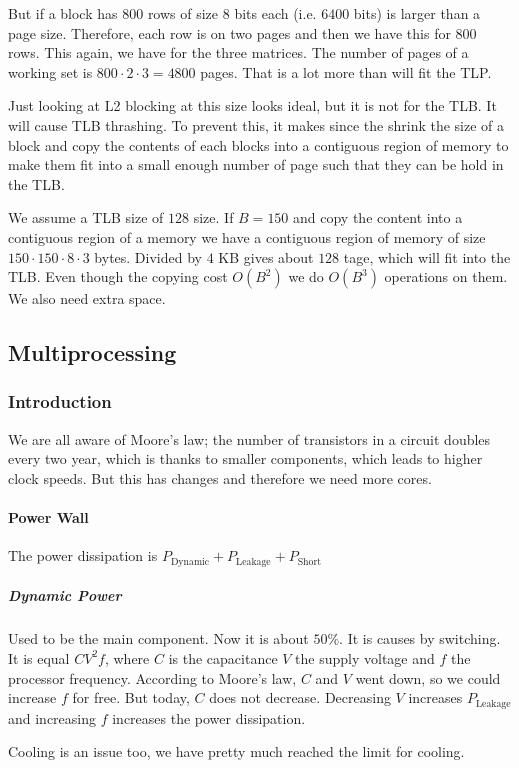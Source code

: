 But if a block has $800$ rows of size $8$ bits each (i.e. $6400$ bits) is larger than a page size. Therefore, each row is on two pages and then we have this for $800$ rows. This again, we have for the three matrices. The number of pages of a working set is $800 \cdot 2 \cdot 3 = 4800$ pages. That is a lot more than will fit the TLP. 

Just looking at L2 blocking at this size looks ideal, but it is not for the TLB. It will cause TLB thrashing. To prevent this, it makes since the shrink the size of a block and copy the contents of each blocks into a contiguous region of memory to make them fit into a small enough number of page such that they can be hold in the TLB.

We assume a TLB size of $128$ size. If $B = 150$ and copy the content into a contiguous region of a memory we have a contiguous region of memory of size $150 \cdot 150 \cdot 8 \cdot 3$ bytes. Divided by $4$ KB gives about $128$ tage, which will fit into the TLB. Even though the copying cost $O(B^2)$ we do $O(B^3)$ operations on them. We also need extra space.

\subsection*{Multiprocessing}
\subsubsection{Introduction}
We are all aware of Moore's law; the number of transistors in a circuit doubles every two year, which is thanks to smaller components, which leads to higher clock speeds. But this has changes and therefore we need more cores.

\paragraph{Power Wall}
The power dissipation is $P_{\text{Dynamic}} + P_{\text{Leakage}} + P_{\text{Short}}$

\subparagraph{Dynamic Power}
Used to be the main component. Now it is about $50\%$. It is causes by switching. It is equal $CV^2f$, where $C$ is the capacitance $V$ the supply voltage and $f$ the processor frequency. According to Moore's law, $C$ and $V$ went down, so we could increase $f$ for free. But today, $C$ does not decrease. Decreasing $V$ increases $P_{\text{Leakage}}$ and increasing $f$ increases the power dissipation.

Cooling is an issue too, we have pretty much reached the limit for cooling.

